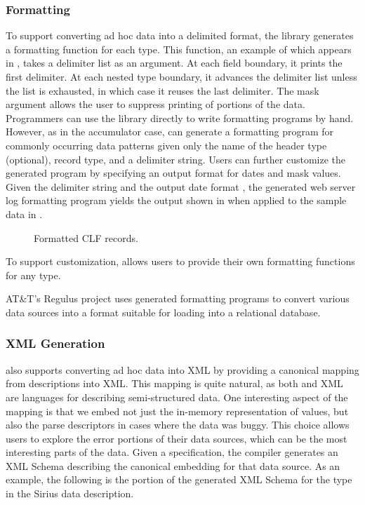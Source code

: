 \documentclass{sig-alternate}
\newcommand{\dibbler}{Sirius}
\newcommand{\darkstar}{Regulus}
\begin{document}
\subsubsection{Formatting}
To support converting ad hoc data into a delimited format, the \pads{}
library generates a formatting function for each type.  This function,
an example of which appears in , takes a delimiter
list as an argument.  At each field boundary, it prints the first delimiter.
At each nested type boundary, it advances the delimiter list unless the list
is exhausted, in which case it reuses the last delimiter.  The mask argument
allows the user to suppress printing of portions of the data.  Programmers
can use the library directly to write formatting programs by hand.  However, 
as in the accumulator case, \pads{} can generate a formatting program for 
commonly occurring data patterns given only the name of the header type (optional), record type, and a delimiter string.  Users can further customize the generated program by specifying an output format for dates and mask values.   Given the delimiter
string  and the output date format , the generated
web server log formatting program yields
the output shown in  when applied to the
sample data in . 
\begin{figure*}
\begin{small}
\begin{center}
\begin{code}

\end{code}
\caption{Formatted CLF records.}
\label{figure:clf-records-formatted}
\end{center}
\end{small}
\end{figure*}
To support customization, \pads{} allows users to provide their own formatting functions for any type.

AT\&T's \darkstar{} project uses generated formatting programs to convert
various data sources into a format suitable for loading into a relational
database.

\subsubsection{XML Generation}
\pads{} also supports converting ad hoc data into XML by providing a canonical mapping from \pads{} descriptions into XML.  This mapping is quite natural, as both \pads{} and XML are languages for describing semi-structured data.
One interesting aspect of the mapping is that we embed not just the in-memory representation of \pads{} values, but also the parse descriptors in cases where the data was buggy.  This choice allows users to explore the error portions
of their data sources, which can be the most interesting parts of the data.
Given a \pads{} specification, the \pads{} compiler generates an XML Schema describing the canonical embedding for that data source.  As an example, 
the following is the portion of the generated XML Schema for the  type in the \dibbler{} data description.
\end{document}
